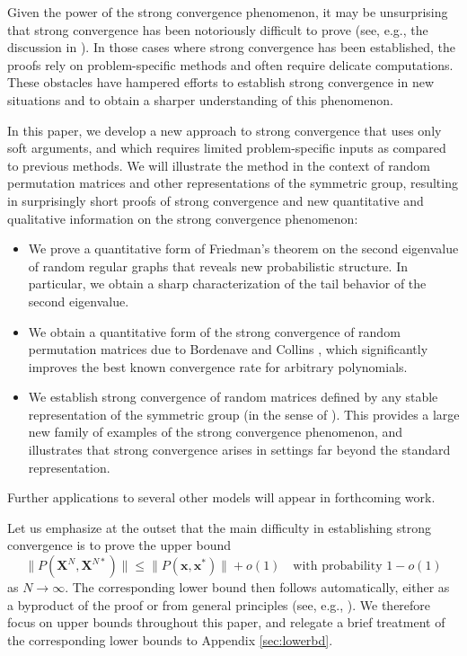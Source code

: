 \documentclass[10pt,reqno]{amsart}
\theoremstyle{definition}
\theoremstyle{remark}
\numberwithin{equation}{section}
\numberwithin{figure}{section}
\numberwithin{table}{section}
\begin{document}
Given the power of the strong convergence phenomenon, it may be 
unsurprising that strong convergence has been notoriously difficult to 
prove (see, e.g., the discussion in \cite{BC20}).
In those cases where strong convergence has been established, the 
proofs rely on problem-specific methods and often require delicate 
computations. These obstacles have hampered efforts to establish strong 
convergence in new situations and to obtain a sharper understanding of 
this phenomenon.

In this paper, we develop a new approach to strong convergence that uses 
only soft arguments, and which requires limited problem-specific 
inputs as compared to previous methods. We will illustrate the 
method in 
the context of 
random permutation matrices and other representations of the symmetric 
group, resulting in surprisingly short proofs of strong convergence and 
new quantitative and qualitative information on the strong convergence 
phenomenon:
\vspace*{.5mm}
\begin{itemize}[leftmargin=*]
\addtolength{\itemsep}{.2cm}
\item We prove a quantitative form of Friedman's theorem on the
second eigenvalue of random regular graphs \cite{Fri08} that
reveals new probabilistic structure. In particular,
we obtain a
sharp characterization of the tail behavior
of the second eigenvalue. 
\item We obtain a quantitative form of the strong 
convergence of random permutation matrices due to Bordenave and Collins 
\cite{BC19,BC24}, which significantly improves the best known convergence 
rate for arbitrary polynomials.
\item We establish strong convergence of random matrices defined by any 
stable representation of the symmetric group (in the sense of \cite{Far14}).
This provides a large new family of examples of the strong convergence 
phenomenon, and illustrates that strong convergence arises in settings
far beyond the standard representation.
\end{itemize}
Further applications to several other models will appear in forthcoming 
work.

Let us emphasize at the outset that the main difficulty in establishing
strong convergence is to prove the upper bound 
$$
	\|P(\boldsymbol{X}^N,\boldsymbol{X}^{N*})\| \le
	\|P(\boldsymbol{x},\boldsymbol{x}^*)\| + o(1)
	\quad\text{with probability }1-o(1)
$$
as $N\to\infty$. The corresponding lower bound then follows 
automatically, either as a byproduct of the proof or from 
general principles (see, e.g., \cite[pp.\ 16--19]{LM23}).
We therefore focus on upper bounds throughout this 
paper, and relegate a brief treatment of the corresponding lower
bounds to Appendix \ref{sec:lowerbd}.
\end{document}
